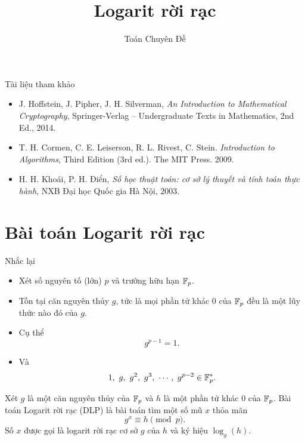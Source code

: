   
\title{Logarit rời rạc} 
 \author{Toán Chuyên Đề}   
   
\maketitle     

\begin{frame}{Tài liệu tham khảo}
  \begin{itemize}
  \item J. Hoffstein, J. Pipher, J. H. Silverman,
    \textit{An Introduction to Mathematical Cryptography},
    Springer-Verlag – Undergraduate Texts in Mathematics, 2nd Ed.,
    2014.
  \item T. H. Cormen, C. E. Leiserson, R. L. Rivest, C. Stein.  \textit{Introduction to Algorithms}, Third Edition (3rd ed.). The MIT Press. 2009.

  \item H. H. Khoái, P. H. Điển, \textit{Số học thuật toán: cơ sở lý thuyết và tính toán thực hành}, NXB Đại học Quốc gia Hà Nội, 2003.
  \end{itemize}
\end{frame}

\section{Bài toán Logarit rời rạc}
\begin{frame}{Nhắc lại}
  \begin{itemize}
  \item Xét số nguyên tố (lớn) $p$  và trường hữu hạn  $\mathbb{F}_p$.
  \item Tồn tại căn nguyên thủy $g$, tức là mọi phần tử khác $0$ của $\mathbb{F}_p$ đều là một lũy thức nào đó của $g$.
  \item Cụ thể 
    $$
    g^{p-1} = 1.
    $$
  \item Và 
    $$
    1,\ g,\ g^2,\ g^3,\ \cdots,\ g^{p-2} \in \F_p^*. 
    $$
  \end{itemize}
\end{frame}

\begin{frame}
  \begin{dfntn}
    Xét $g$ là một căn nguyên thủy của $\mathbb{F}_p$ và $h$ là một phần tử khác $0$ của $\mathbb{F}_p$. Bài toán Logarit rời rạc (DLP) là bài toán tìm một số mũ $x$ thỏa mãn 
    $$
    g^x \equiv h \pmod{p}.
    $$
Số $x$ được gọi là logarit rời rạc cơ sở  $g$ của $h$ và ký hiệu $\log_g(h)$. 
  \end{dfntn}
\end{frame}

